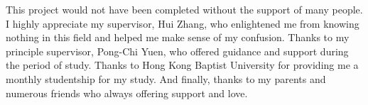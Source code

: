 
This project would not have been completed without the support of many people. I highly appreciate my supervisor, Hui Zhang, who enlightened me from knowing nothing in this field and helped me make sense of my confusion. Thanks to my principle supervisor, Pong-Chi Yuen, who offered guidance and support during the period of study. Thanks to Hong Kong Baptist University for providing me a monthly studentship for my study. And finally, thanks to my parents and numerous friends who always offering support and love.

